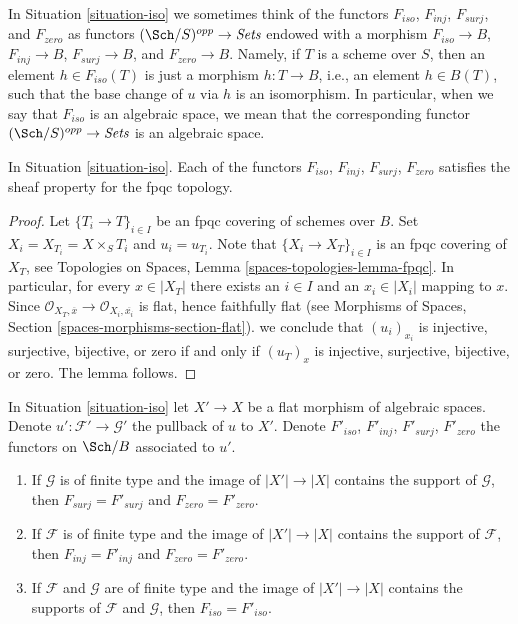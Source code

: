\noindent
In Situation \ref{situation-iso} we sometimes think of the functors
$F_{iso}$, $F_{inj}$, $F_{surj}$, and $F_{zero}$ as functors
$(\Sch/S)^{opp} \to \textit{Sets}$ endowed with a morphism
$F_{iso} \to B$, $F_{inj} \to B$, $F_{surj} \to B$, and $F_{zero} \to B$.
Namely, if $T$ is a scheme over $S$, then an element $h \in F_{iso}(T)$
is just a morphism $h : T \to B$, i.e., an element $h \in B(T)$,
such that the base change of $u$ via $h$ is an isomorphism.
In particular, when we say
that $F_{iso}$ is an algebraic space, we mean that the corresponding
functor $(\Sch/S)^{opp} \to \textit{Sets}$ is an algebraic space.

\begin{lemma}
\label{lemma-iso-sheaf}
In Situation \ref{situation-iso}.
Each of the functors $F_{iso}$, $F_{inj}$, $F_{surj}$, $F_{zero}$
satisfies the sheaf property for the fpqc topology.
\end{lemma}

\begin{proof}
Let $\{T_i \to T\}_{i \in I}$ be an fpqc covering of schemes over $B$.
Set $X_i = X_{T_i} = X \times_S T_i$ and $u_i = u_{T_i}$.
Note that $\{X_i \to X_T\}_{i \in I}$ is an fpqc covering of $X_T$, see
Topologies on Spaces, Lemma \ref{spaces-topologies-lemma-fpqc}.
In particular, for every $x \in |X_T|$ there exists an $i \in I$
and an $x_i \in |X_i|$ mapping to $x$. Since
$\mathcal{O}_{X_T, \overline{x}} \to \mathcal{O}_{X_i, \overline{x_i}}$
is flat, hence faithfully flat (see 
Morphisms of Spaces, Section \ref{spaces-morphisms-section-flat}).
we conclude that $(u_i)_{x_i}$ is injective, surjective, bijective, or zero
if and only if $(u_T)_x$ is injective, surjective, bijective, or zero.
The lemma follows.
\end{proof}

\begin{lemma}
\label{lemma-iso-go-up}
In Situation \ref{situation-iso} let $X' \to X$ be a flat morphism
of algebraic spaces. Denote $u' : \mathcal{F}' \to \mathcal{G}'$
the pullback of $u$ to $X'$. Denote $F'_{iso}$, $F'_{inj}$, $F'_{surj}$,
$F'_{zero}$ the functors on $\Sch/B$ associated to $u'$.
\begin{enumerate}
\item If $\mathcal{G}$ is of finite type and the image of $|X'| \to |X|$
contains the support of $\mathcal{G}$, then $F_{surj} = F'_{surj}$
and $F_{zero} = F'_{zero}$.
\item If $\mathcal{F}$ is of finite type and the image of $|X'| \to |X|$
contains the support of $\mathcal{F}$, then $F_{inj} = F'_{inj}$
and $F_{zero} = F'_{zero}$.
\item If $\mathcal{F}$ and $\mathcal{G}$ are of finite type and the image of
$|X'| \to |X|$ contains the supports of $\mathcal{F}$ and $\mathcal{G}$,
then $F_{iso} = F'_{iso}$.
\end{enumerate}
\end{lemma}


